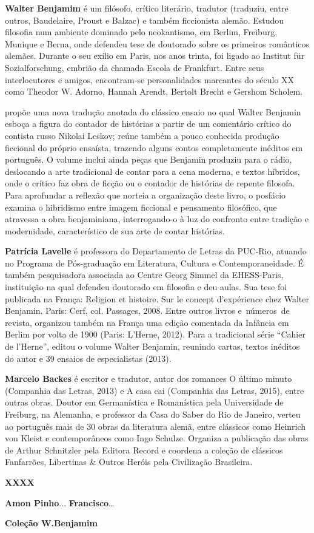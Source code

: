 
\textbf{Walter Benjamim} é um filósofo, crítico literário, tradutor (traduziu, entre outros, Baudelaire, Proust e Balzac) e também ficcionista alemão. Estudou filosofia num ambiente dominado pelo neokantismo, em Berlim, Freiburg, Munique e Berna, onde defendeu tese de doutorado sobre os primeiros românticos alemães. Durante o seu exílio em Paris, nos anos trinta, foi ligado ao Institut für Sozialforschung, embrião da chamada Escola de Frankfurt. Entre seus interlocutores e amigos, encontram-se personalidades marcantes do século XX como Theodor W. Adorno, Hannah Arendt, Bertolt Brecht e Gershom Scholem.

\textbf{\titulo} propõe uma nova tradução anotada do clássico ensaio no qual Walter Benjamin esboça a figura do contador de histórias a partir de um comentário crítico do contista russo Nikolai Leskov; reúne também a pouco conhecida produção ficcional do próprio ensaísta, trazendo alguns contos completamente inéditos em português. O volume inclui ainda peças que Benjamin produziu para o rádio, deslocando a arte tradicional de contar para a cena moderna, e textos híbridos, onde o crítico faz obra de ficção ou o contador de histórias de repente filosofa. Para aprofundar a reflexão que norteia a organização deste livro, o posfácio examina o hibridismo entre imagem ficcional e pensamento filosófico, que atravessa a obra benjaminiana, interrogando-o à luz do confronto entre tradição e modernidade, característico de sua arte de contar histórias.

\textbf{Patrícia Lavelle} é professora do Departamento de Letras da PUC-Rio, atuando no Programa de Pós-graduação em Literatura, Cultura e Contemporaneidade. É também pesquisadora associada ao Centre Georg Simmel da EHESS-Paris,  instituição na qual defendeu doutorado em filosofia e deu aulas. Sua tese foi publicada na França: Religion et histoire. Sur le concept d’expérience chez Walter Benjamin. Paris: Cerf, col. Passages, 2008. Entre outros livros e números de revista, organizou também na França uma edição comentada da Infância em Berlim por volta de 1900 (Paris: L’Herne, 2012). Para a tradicional série “Cahier de l’Herne”, editou o volume Walter Benjamin, reunindo cartas, textos inéditos do autor e 39 ensaios de especialistas (2013). 

\textbf{Marcelo Backes} é escritor e tradutor, autor dos romances O último minuto (Companhia das Letras, 2013) e A casa cai (Companhia das Letras, 2015), entre outras obras. Doutor em Germanística e Romanística pela Universidade de Freiburg, na Alemanha, e professor da Casa do Saber do Rio de Janeiro, verteu ao português mais de 30 obras da literatura alemã, entre clássicos como Heinrich von Kleist e contemporâneos como Ingo Schulze. Organiza a publicação das obras de Arthur Schnitzler pela Editora Record e coordena a coleção de clássicos Fanfarrões, Libertinas \& Outros Heróis pela Civilização Brasileira.

\textbf{XXXX} \lipsum[4]

\textbf{Amon Pinho}...
\textbf{Francisco}…

\textbf{Coleção W.Benjamim} \lipsum[6]


